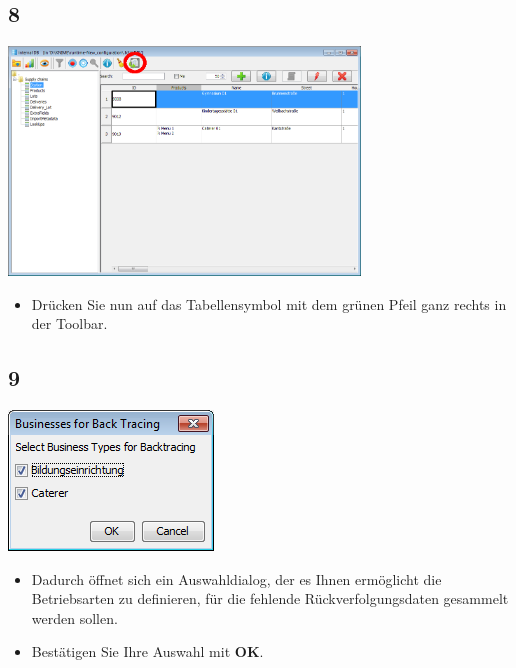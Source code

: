 \documentclass{beamer}
\begin{document}
\subsection{8}
\begin{frame}
	\begin{center}
  		\includegraphics[width=0.7\textwidth]{8.png}
	\end{center}
	\begin{itemize}
		\item Drücken Sie nun auf das Tabellensymbol mit dem grünen Pfeil ganz rechts in der Toolbar.
	\end{itemize}
\end{frame}

\subsection{9}
\begin{frame}
	\begin{center}
  		\includegraphics[height=0.5\textheight]{9.png}
	\end{center}
	\begin{itemize}
		\item Dadurch öffnet sich ein Auswahldialog, der es Ihnen ermöglicht die Betriebsarten zu definieren, für die fehlende Rückverfolgungsdaten gesammelt werden sollen.
		\item Bestätigen Sie Ihre Auswahl mit \textbf{OK}.
	\end{itemize}
\end{frame}
\end{document}
